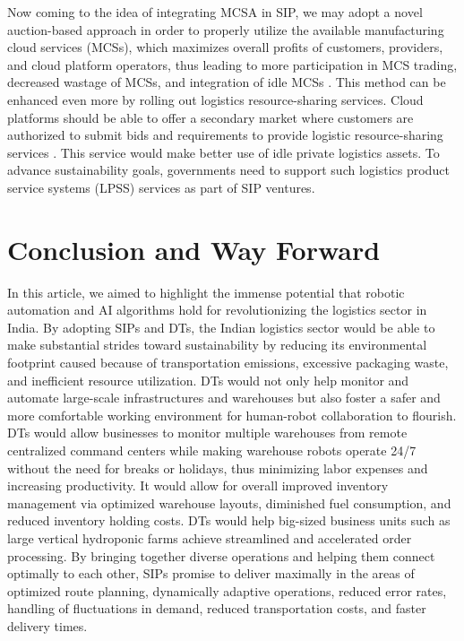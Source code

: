 \documentclass[paper=a4wide, fontsize=12pt]{scrartcl}	 %
\begin{document}
Now coming to the idea of integrating MCSA in SIP, we may adopt a novel auction-based approach in order to properly utilize the available manufacturing cloud services (MCSs), which maximizes overall profits of customers, providers, and cloud platform operators, thus leading to more participation in MCS trading, decreased wastage of MCSs, and integration of idle MCSs \cite{Kang2022}. This method can be enhanced even more by rolling out logistics resource-sharing services. Cloud platforms should be able to offer a secondary market where customers are authorized to submit bids and requirements to provide logistic resource-sharing services \cite{KANG2021123881}. This service would make better use of idle private logistics assets. To advance sustainability goals, governments need to support such logistics product service systems (LPSS) services as part of SIP ventures.

\section*{Conclusion and Way Forward}

In this article, we aimed to highlight the immense potential that robotic automation and AI algorithms hold for revolutionizing the logistics sector in India. By adopting SIPs and DTs, the Indian logistics sector would be able to make substantial strides toward sustainability by reducing its environmental footprint caused because of transportation emissions, excessive packaging waste, and inefficient resource utilization. DTs would not only help monitor and automate large-scale infrastructures and warehouses but also foster a safer and more comfortable working environment for human-robot collaboration to flourish. DTs would allow businesses to monitor multiple warehouses from remote centralized command centers while making warehouse robots operate 24/7 without the need for breaks or holidays, thus minimizing labor expenses and increasing productivity. It would allow for overall improved inventory management via optimized warehouse layouts, diminished fuel consumption, and reduced inventory holding costs. DTs would help big-sized business units such as large vertical hydroponic farms achieve streamlined and accelerated order processing. By bringing together diverse operations and helping them connect optimally to each other, SIPs promise to deliver maximally in the areas of optimized route planning, dynamically adaptive operations, reduced error rates, handling of fluctuations in demand, reduced transportation costs, and faster delivery times. \\
\end{document}
